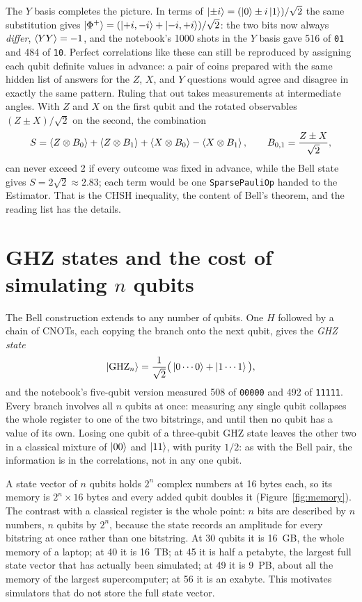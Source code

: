 \documentclass[11pt]{article}
\newcommand{\code}[1]{\texttt{#1}}
\begin{document}
The $Y$ basis completes the picture. In terms of $\ket{{\pm}i} = (\ket{0} \pm i\ket{1})/\sqrt2$ the same substitution gives $\ket{\Phi^+} = (\ket{{+}i,{-}i} + \ket{{-}i,{+}i})/\sqrt2$: the two bits now always \emph{differ}, $\braket{YY} = -1$, and the notebook's 1000 shots in the $Y$ basis gave 516 of \code{01} and 484 of \code{10}. Perfect correlations like these can still be reproduced by assigning each qubit definite values in advance: a pair of coins prepared with the same hidden list of answers for the $Z$, $X$, and $Y$ questions would agree and disagree in exactly the same pattern. Ruling that out takes measurements at intermediate angles. With $Z$ and $X$ on the first qubit and the rotated observables $(Z \pm X)/\sqrt2$ on the second, the combination
\begin{equation}
S = \braket{Z\otimes B_0} + \braket{Z\otimes B_1} + \braket{X\otimes B_0} - \braket{X\otimes B_1},\qquad B_{0,1} = \frac{Z \pm X}{\sqrt2},
\label{eq:chsh}
\end{equation}
can never exceed 2 if every outcome was fixed in advance, while the Bell state gives $S = 2\sqrt2 \approx 2.83$; each term would be one \code{SparsePauliOp} handed to the Estimator. That is the CHSH inequality, the content of Bell's theorem, and the reading list has the details.

\section{GHZ states and the cost of simulating \texorpdfstring{$n$}{n} qubits}

The Bell construction extends to any number of qubits. One $H$ followed by a chain of CNOTs, each copying the branch onto the next qubit, gives the \emph{GHZ state}
\begin{equation}
\ket{\mathrm{GHZ}_n} = \frac{1}{\sqrt2}\big(\ket{0\cdots0} + \ket{1\cdots1}\big),
\end{equation}
and the notebook's five-qubit version measured 508 of \code{00000} and 492 of \code{11111}. Every branch involves all $n$ qubits at once: measuring any single qubit collapses the whole register to one of the two bitstrings, and until then no qubit has a value of its own. Losing one qubit of a three-qubit GHZ state leaves the other two in a classical mixture of $\ket{00}$ and $\ket{11}$, with purity $1/2$: as with the Bell pair, the information is in the correlations, not in any one qubit.

A state vector of $n$ qubits holds $2^n$ complex numbers at 16 bytes each, so its memory is $2^n \times 16$ bytes and every added qubit doubles it (Figure~\ref{fig:memory}). The contrast with a classical register is the whole point: $n$ bits are described by $n$ numbers, $n$ qubits by $2^n$, because the state records an amplitude for every bitstring at once rather than one bitstring. At 30 qubits it is 16~GB, the whole memory of a laptop; at 40 it is 16~TB; at 45 it is half a petabyte, the largest full state vector that has actually been simulated; at 49 it is 9~PB, about all the memory of the largest supercomputer; at 56 it is an exabyte. This motivates simulators that do not store the full state vector.
\end{document}

